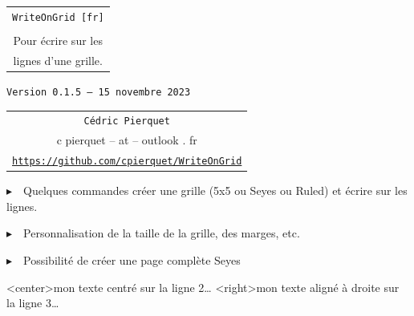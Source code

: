 \documentclass[a4paper]{article}
\def\TPversion{0.1.5}
\def\TPdate{15 novembre 2023}
\begin{document}
\pagestyle{fancy}

\thispagestyle{empty}

\vspace{2cm}

\begin{center}
	\begin{minipage}{0.75\linewidth}
	\begin{tcolorbox}[colframe=yellow,colback=yellow!15]
		\begin{center}
			\begin{tabular}{c}
				{\Huge \texttt{WriteOnGrid [fr]}}\\
				\\
				{\LARGE Pour écrire sur les} \\
				{\LARGE lignes d'une grille.}
			\end{tabular}
			
			\medskip
			
			{\small \texttt{Version \TPversion{} -- \TPdate}}
		\end{center}
	\end{tcolorbox}
\end{minipage}
\end{center}

\vspace{0.5cm}

\begin{center}
	\begin{tabular}{c}
	\texttt{Cédric Pierquet}\\
	{\ttfamily c pierquet -- at -- outlook . fr}\\
	\texttt{\url{https://github.com/cpierquet/WriteOnGrid}}
\end{tabular}
\end{center}

\vspace{0.5cm}

{$\blacktriangleright$~~Quelques commandes créer une grille (5x5 ou Seyes ou Ruled) et écrire \og sur \fg{} les lignes.}

\smallskip

{$\blacktriangleright$~~Personnalisation de la taille de la grille, des marges, etc.}

\smallskip

{$\blacktriangleright$~~Possibilité de créer une page complète Seyes}

\vspace{1cm}

\begin{center}
	\begin{EnvQuadrillage}[NbCarreaux=22x8]
	\EcrireLigne<center>{mon texte centré sur la ligne 2\ldots}
	\EcrireLigne<right>{mon texte aligné à droite sur la ligne 3\ldots}
	\PasseLigne
\end{EnvQuadrillage}
\end{center}
\end{document}
